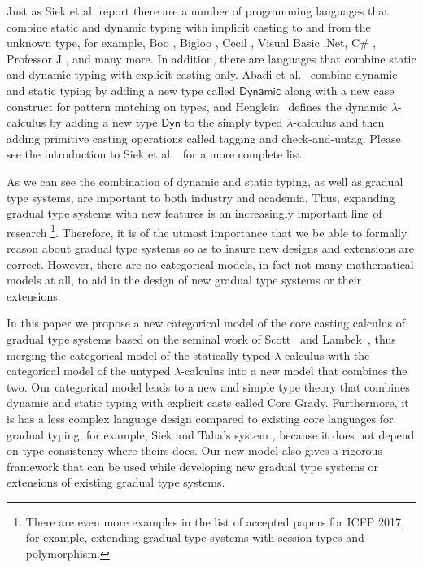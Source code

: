 Just as Siek et al. report \cite{Siek:2006,Siek:2007,Siek:2015} there
are a number of programming languages that combine static and dynamic
typing with implicit casting to and from the unknown type, for
example, Boo \cite{Oliveira:2005}, Bigloo
\cite{Bres:2004,Serrano:2002}, Cecil \cite{Chambers:2004}, Visual
Basic .Net, C\# \cite{Meijer:2004}, Professor J
\cite{Gray:2005:FIT:1103845.1094830}, and many more.  In addition,
there are languages that combine static and dynamic typing with
explicit casting only. Abadi et al.~\cite{Abadi:1989} combine dynamic
and static typing by adding a new type called $\mathsf{Dynamic}$ along
with a new case construct for pattern matching on types, and
Henglein~\cite{Henglein:1994} defines the dynamic $\lambda$-calculus
by adding a new type $\mathsf{Dyn}$ to the simply typed
$\lambda$-calculus and then adding primitive casting operations called
tagging and check-and-untag. Please see the introduction to Siek et
al.~\cite{Siek:2015} for a more complete list.

As we can see the combination of dynamic and static typing, as well as
gradual type systems, are important to both industry and academia.
Thus, expanding gradual type systems with new features is an
increasingly important line of research
\cite{Siek:2006,Siek:2007,Garcia:2016,
  Lehmann:2017:GRT:3009837.3009856,
  Jafery:2017:SUR:3093333.3009865}\footnote{There are even more
  examples in the list of accepted papers for ICFP 2017, for example,
  extending gradual type systems with session types and
  polymorphism.}.  Therefore, it is of the utmost importance that we
be able to formally reason about gradual type systems so as to insure
new designs and extensions are correct.  However, there are no
categorical models, in fact not many mathematical models at all, to
aid in the design of new gradual type systems or their extensions.

In this paper we propose a new categorical model of the core casting
calculus of gradual type systems based on the seminal work of
Scott~\cite{Sewell:2010} and Lambek~\cite{Lambek:1988}, thus merging
the categorical model of the statically typed $\lambda$-calculus with
the categorical model of the untyped $\lambda$-calculus into a new
model that combines the two.  Our categorical model leads to a new and
simple type theory that combines dynamic and static typing with
explicit casts called Core Grady.  Furthermore, it is has a less
complex language design compared to existing core languages for
gradual typing, for example, Siek and Taha's system \cite{Siek:2007},
because it does not depend on type consistency where theirs does.  Our
new model also gives a rigorous framework that can be used while
developing new gradual type systems or extensions of existing gradual
type systems.

